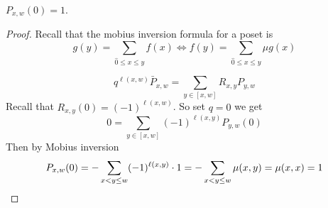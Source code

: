 \begin{theorem}
	$P_{x,w}(0)=1$.
\end{theorem}
\begin{proof}Recall that the mobius inversion formula for a poset is
	$$g(y)=\sum_{\hat 0\leq x\leq y}f(x)\iff f(y)=\sum_{\hat 0\leq x\leq y}\mu g(x)$$

\[q^{\ell(x,w)}\bar P_{x,w} = \sum_{y\in[x,w]}R_{x,y}P_{y,w}\]
Recall that $R_{x,y}(0)=(-1)^{\ell(x,w)}$.
So set $q=0$ we get
\[0=\sum_{y\in[x,w]} (-1)^{\ell(x,y)} P_{y,w}(0)\]
Then by Mobius inversion
\[P_{x,w}(0)=-\sum_{x<y\leq w}(-1)^{\ell(x,y)}\cdot 1=-\sum_{x<y\leq w}\mu (x,y)=\mu(x,x)=1\qedhere\]
\end{proof}
